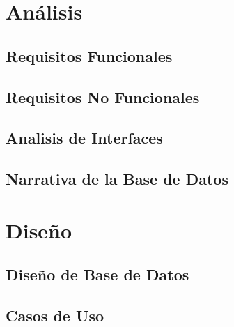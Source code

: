 \documentclass{article}
\begin{document}
\section{Análisis}
\subsection{Requisitos Funcionales}
\subsection{Requisitos No Funcionales}
\subsection{Analisis de Interfaces}
\subsection{Narrativa de la Base de Datos}
\section{Diseño}
\subsection{Diseño de Base de Datos}
\subsection{Casos de Uso}
\end{document}
